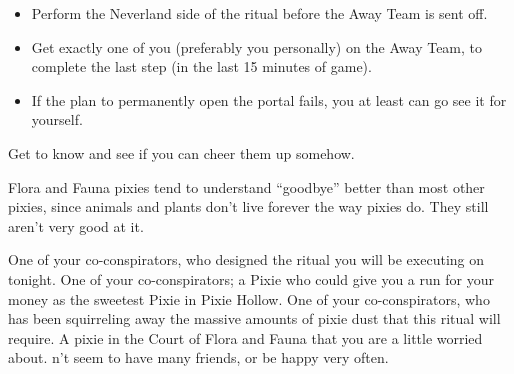 \documentclass[char]{PP}
\begin{document}
\begin{itemz}
	\item 
	\begin{itemize}
		\item Perform the Neverland side of the ritual before the Away Team is sent off.
		\item Get exactly one of you (preferably you personally) on the Away Team, to complete the last step (in the last 15 minutes of game).
		\item If the plan to permanently open the portal fails, you at least can go see it for yourself.
	\end{itemize}
	\item Get to know \cFWanabe{} and see if you can cheer them up somehow.
\end{itemz}

\begin{itemz}[Notes]
	\item Flora and Fauna pixies tend to understand ``goodbye'' better than most other pixies, since animals and plants don’t live forever the way pixies do. They still aren't very good at it.
\end{itemz}

\begin{contacts}
	\contact{\cSLibrarian{}} One of your co-conspirators, who designed the ritual you will be executing on tonight.
	\contact{\cESweet{}} One of your co-conspirators; a Pixie who could give you a run for your money as the sweetest Pixie in Pixie Hollow.
	\contact{\cMIron{}} One of your co-conspirators, who has been squirreling away the massive amounts of pixie dust that this ritual will require.
	\contact{\cFWanabe{}} A pixie in the Court of Flora and Fauna that you are a little worried about. \cFWanabe{\They} \cFWanabe{\does}n’t seem to have many friends, or be happy very often.
\end{contacts}
\end{document}
